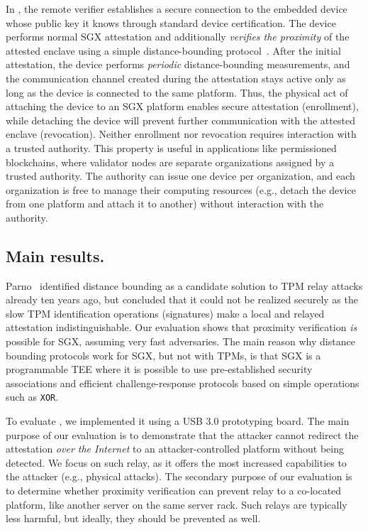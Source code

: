 In \name, the remote verifier establishes a secure connection to the embedded device whose public key it knows through standard device certification. The device performs normal SGX attestation and additionally \emph{verifies the proximity} of the attested enclave using a simple distance-bounding protocol~\cite{distanceBounding}. After the initial attestation, the device performs \emph{periodic} distance-bounding measurements, and the communication channel created during the attestation stays active only as long as the device is connected to the same platform. Thus, the physical act of attaching the device to an SGX platform enables secure attestation (enrollment), while detaching the device will prevent further communication with the attested enclave (revocation). Neither enrollment nor revocation requires interaction with a trusted authority. This property is useful in applications like permissioned blockchains, where validator nodes are separate organizations assigned by a trusted authority. The authority can issue one device per organization, and each organization is free to manage their computing resources (e.g., detach the device from one platform and attach it to another) without interaction with the authority. 


\subsection{Main results.} Parno~\cite{parno2008bootstrapping} identified distance bounding as a candidate solution to TPM relay attacks already ten years ago, but concluded that it could not be realized securely as the slow TPM identification operations (signatures) make a local and relayed attestation indistinguishable. Our evaluation shows that proximity verification \emph{is} possible for SGX, assuming very fast adversaries. The main reason why distance bounding protocols work for SGX, but not with TPMs, is that SGX is a programmable TEE where it is possible to use pre-established security associations and efficient challenge-response protocols based on simple operations such as \texttt{XOR}.

To evaluate \name, we implemented it using a USB 3.0 prototyping board. The main purpose of our evaluation is to demonstrate that the attacker cannot redirect the attestation \emph{over the Internet} to an attacker-controlled platform without being detected. We focus on such relay, as it offers the most increased capabilities to the attacker (e.g., physical attacks). The secondary purpose of our evaluation is to determine whether proximity verification can prevent relay to a co-located platform, like another server on the same server rack. Such relays are typically less harmful, but ideally, they should be prevented as well.



